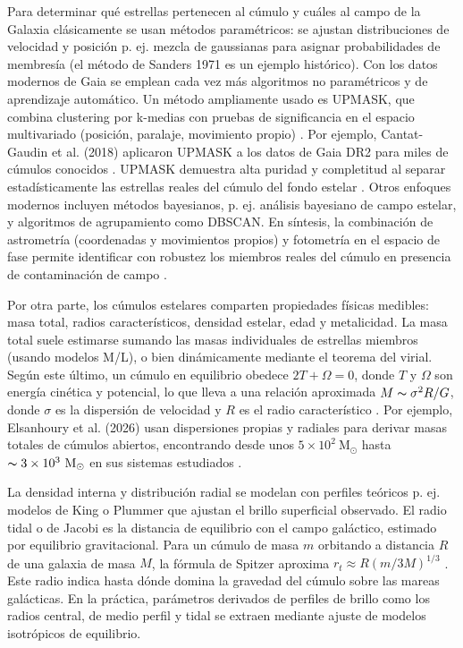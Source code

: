     Para determinar qué estrellas pertenecen al cúmulo y cuáles al campo de la 
    Galaxia clásicamente se usan métodos paramétricos: se ajustan distribuciones 
    de velocidad y posición p. ej. mezcla de gaussianas para asignar 
    probabilidades de membresía (el método de Sanders 1971 
    \cite{sanders1971improved} es un ejemplo histórico). Con los datos modernos 
    de Gaia se emplean cada vez más algoritmos no paramétricos y de aprendizaje 
    automático. Un método ampliamente usado es UPMASK, que combina clustering 
    por k-medias con pruebas de significancia en el espacio multivariado 
    (posición, paralaje, movimiento propio) \cite{Elsanhoury2026}. Por ejemplo, 
    Cantat-Gaudin et al. (2018) aplicaron UPMASK a los datos de Gaia DR2 para 
    miles de cúmulos conocidos \cite{cantat2018gaia}. UPMASK demuestra alta 
    puridad y completitud al separar estadísticamente las estrellas reales del 
    cúmulo del fondo estelar \cite{Elsanhoury2026}\cite{cantat2018gaia}. Otros 
    enfoques modernos incluyen métodos bayesianos, p. ej. análisis bayesiano de 
    campo estelar, y algoritmos de agrupamiento como DBSCAN. En síntesis, la 
    combinación de astrometría (coordenadas y movimientos propios) y fotometría 
    en el espacio de fase permite identificar con robustez los miembros reales 
    del cúmulo en presencia de contaminación de campo \cite{Elsanhoury2026} 
    \cite{cantat2018gaia}.

    Por otra parte, los cúmulos estelares comparten propiedades físicas 
    medibles: masa total, radios característicos, densidad estelar, edad y 
    metalicidad. La masa total suele estimarse sumando las masas individuales de 
    estrellas miembros (usando modelos M/L), o bien dinámicamente mediante el 
    teorema del virial. Según este último, un cúmulo en equilibrio obedece $2T + 
    \Omega = 0$, donde $T$ y $\Omega$ son energía cinética y potencial, lo que 
    lleva a una relación aproximada $M \thicksim \sigma^2 R/G$, donde $\sigma$ 
    es la dispersión de velocidad y $R$ es el radio característico 
    \cite{Elsanhoury2026}. Por ejemplo, Elsanhoury et al. (2026) usan 
    dispersiones propias y radiales para derivar masas totales de cúmulos 
    abiertos, encontrando desde unos $5 \times 10^2 \ \text{M}_\odot$ hasta 
    $\thicksim 3 \times 10^3 \ \text{M}_\odot$ en sus sistemas estudiados 
    \cite{Elsanhoury2026}.

    La densidad interna y distribución radial se modelan con perfiles teóricos 
    p. ej. modelos de King o Plummer que ajustan el brillo superficial 
    observado. El radio tidal o de Jacobi es la distancia de equilibrio con el 
    campo galáctico, estimado por equilibrio gravitacional. Para un cúmulo de 
    masa $m$ orbitando a distancia $R$ de una galaxia de masa $M$, la fórmula de 
    Spitzer aproxima $r_t \approx R(m/3M)^{1/3}$ \cite{Renaud2018}. Este radio 
    indica hasta dónde domina la gravedad del cúmulo sobre las mareas 
    galácticas. En la práctica, parámetros derivados de perfiles de brillo como 
    los radios central, de medio perfil y tidal se extraen mediante ajuste de 
    modelos isotrópicos de equilibrio.

